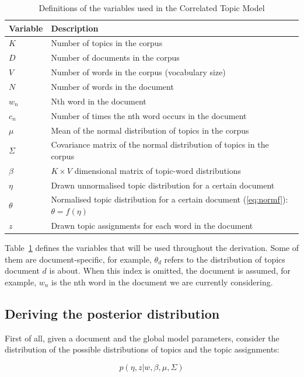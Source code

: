\documentclass[12pt,a4paper,twoside,openright]{report}
\begin{document}
\begin{table}
\centering
\begin{tabular}{| l | l |}
\hline
Variable & Description \\
\hline
$K$ & Number of topics in the corpus \\
$D$ & Number of documents in the corpus \\
$V$ & Number of words in the corpus (vocabulary size) \\
$N$ & Number of words in the document \\
$w_n$ & Nth word in the document \\
$c_n$ & Number of times the nth word occurs in the document \\
$\mu$ & Mean of the normal distribution of topics in the corpus \\
$\Sigma$ & Covariance matrix of the normal distribution of topics in the corpus \\
$\beta$ & $K \times V$ dimensional matrix of topic-word distributions \\
$\eta$ & Drawn unnormalised topic distribution for a certain document \\
$\theta$ & Normalised topic distribution for a certain document (\ref{eq:normf}): $\theta = f(\eta)$ \\
$z$ & Drawn topic assignments for each word in the document \\
\hline
\end{tabular}
\caption{Definitions of the variables used in the Correlated Topic Model}
\label{tab:ctm-variables}
\end{table}

Table~\ref{tab:ctm-variables} defines the variables that will be used throughout the derivation. Some of them are document-specific, for example, $\theta_d$ refers to the distribution of topics document $d$ is about. When this index is omitted, the document is assumed, for example, $w_n$ is the nth word in the document we are currently considering.

\subsection{Deriving the posterior distribution}

First of all, given a document and the global model parameters, consider the distribution of the possible distributions of topics and the topic assignments:

\begin{equation}
p(\eta, z | w, \beta, \mu, \Sigma)
\end{equation}
\end{document}
